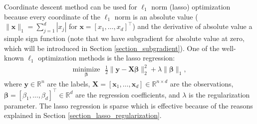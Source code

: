 \documentclass[lang=cn,10pt]{gorgeousnbook}
\numberwithin{equation}{section}%
\numberwithin{figure}{section}%
\begin{document}

Coordinate descent method can be used for $\ell_1$ norm (lasso) optimization \cite{wu2008coordinate} because every coordinate of the $\ell_1$ norm is an absolute value ($\|\boldsymbol{x}\|_1 = \sum_{j=1}^d |x_j|$ for $\boldsymbol{x} = [x_1, \dots, x_d]^\top$) and the derivative of absolute value a simple sign function (note that we have subgradient for absolute value at zero, which will be introduced in Section \ref{section_subgradient}).
One of the well-known $\ell_1$ optimization methods is the lasso regression:
\begin{align}\label{equation_lasso_regression}
\underset{\boldsymbol{\beta}}{\text{minimize}} ~~~ \frac{1}{2} \|\boldsymbol{y} - \boldsymbol{X} \boldsymbol{\beta}\|_2^2 + \lambda \|\boldsymbol{\beta}\|_1,
\end{align}
where $\boldsymbol{y} \in \mathbb{R}^n$ are the labels, $\boldsymbol{X} = [\boldsymbol{x}_1, \dots, \boldsymbol{x}_d] \in \mathbb{R}^{n \times d}$ are the observations, $\boldsymbol{\beta} = [\beta_1, \dots, \beta_d]^\top \in \mathbb{R}^d$ are the regression coefficients, and $\lambda$ is the regularization parameter. 
The lasso regression is sparse which is effective because of the reasons explained in Section \ref{section_lasso_regularization}. 
\end{document}
